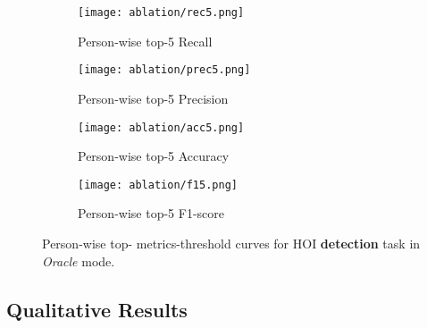 \documentclass[times,twocolumn,final,authoryear]{elsarticle}
\begin{document}
\begin{figure*}
    \centering
    \begin{subfigure}[]{0.24\textwidth}
        \texttt{[image: ablation/rec5.png]}
        \caption{Person-wise top-5 Recall}
    \end{subfigure}
    \begin{subfigure}[]{0.24\textwidth}
        \texttt{[image: ablation/prec5.png]}
        \caption{Person-wise top-5 Precision}
    \end{subfigure}
    \begin{subfigure}[]{0.24\textwidth}
        \texttt{[image: ablation/acc5.png]}
        \caption{Person-wise top-5 Accuracy}
    \end{subfigure}
    \begin{subfigure}[]{0.24\textwidth}
        \texttt{[image: ablation/f15.png]}
        \caption{Person-wise top-5 F1-score}
    \end{subfigure}

    \caption{Person-wise top- metrics-threshold curves for HOI \textbf{detection} task in \textit{Oracle} mode. }
    \label{fig:ablation_thres}
\end{figure*}

\subsection{Qualitative Results}
\end{document}
